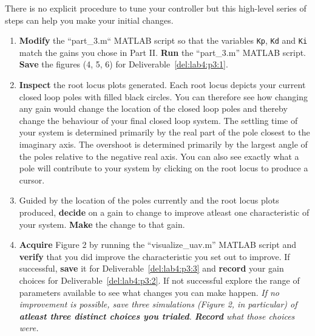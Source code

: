 \begin{procedure}[label={proc:lab4:tune}]
  There is no explicit procedure to tune your controller but this high-level series of steps can help you make your initial changes.
  \begin{enumerate}[label={(\arabic*)}]
    \item{%
      \textbf{Modify} the ``part\_3.m`` MATLAB script so that the variables \texttt{Kp}, \texttt{Kd} and \texttt{Ki} match the gains you chose in Part II.
      \textbf{Run} the ``part\_3.m'' MATLAB script.
      \textbf{Save} the figures (4, 5, 6) for Deliverable~\ref{del:lab4:p3:1}.
    }
    \item{%
      \textbf{Inspect} the root locus plots generated.
      Each root locus depicts your current closed loop poles with filled black circles.
      You can therefore see how changing any gain would change the location of the closed loop poles and thereby change the behaviour of your final closed loop system.
      The settling time of your system is determined primarily by the real part of the pole closest to the imaginary axis.
      The overshoot is determined primarily by the largest angle of the poles relative to the negative real axis.
      You can also see exactly what a pole will contribute to your system by clicking on the root locus to produce a cursor.
    }
    \item{%
      Guided by the location of the poles currently and the root locus plots produced, \textbf{decide} on a gain to change to improve atleast one characteristic of your system.
      \textbf{Make} the change to that gain. 
    }
    \item{%
      \textbf{Acquire} Figure 2 by running the ``visualize\_uav.m'' MATLAB script and \textbf{verify} that you did improve the characteristic you set out to improve.
      If successful, \textbf{save} it for Deliverable~\ref{del:lab4:p3:3} and \textbf{record} your gain choices for Deliverable~\ref{del:lab4:p3:2}.
      If not successful explore the range of parameters available to see what changes you can make happen.
      \emph{If no improvement is possible, save three simulations (Figure 2, in particular) of \textbf{atleast three distinct choices you trialed}. \textbf{Record} what those choices were.}
    }
  \end{enumerate}
\end{procedure}

